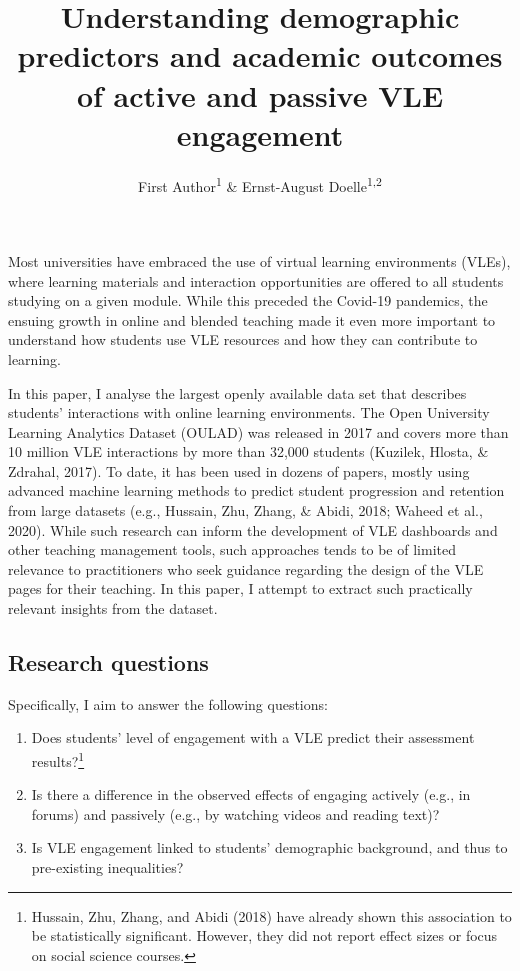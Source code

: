\documentclass[
  english,
  man,mask,floatsintext]{apa6}
\title{Understanding demographic predictors and academic outcomes of active and passive VLE engagement}
\author{First Author\textsuperscript{1} \& Ernst-August Doelle\textsuperscript{1,2}}
\date{}
\affiliation{\vspace{0.5cm}\textsuperscript{1} Wilhelm-Wundt-University\\\textsuperscript{2} Konstanz Business School}
\providecommand{\tightlist}{%
  \setlength{\itemsep}{0pt}\setlength{\parskip}{0pt}}
\begin{document}
\maketitle

Most universities have embraced the use of virtual learning environments (VLEs), where learning materials and interaction opportunities are offered to all students studying on a given module. While this preceded the Covid-19 pandemics, the ensuing growth in online and blended teaching made it even more important to understand how students use VLE resources and how they can contribute to learning.

In this paper, I analyse the largest openly available data set that describes students' interactions with online learning environments. The Open University Learning Analytics Dataset (OULAD) was released in 2017 and covers more than 10 million VLE interactions by more than 32,000 students (Kuzilek, Hlosta, \& Zdrahal, 2017). To date, it has been used in dozens of papers, mostly using advanced machine learning methods to predict student progression and retention from large datasets (e.g., Hussain, Zhu, Zhang, \& Abidi, 2018; Waheed et al., 2020). While such research can inform the development of VLE dashboards and other teaching management tools, such approaches tends to be of limited relevance to practitioners who seek guidance regarding the design of the VLE pages for their teaching. In this paper, I attempt to extract such practically relevant insights from the dataset.

\hypertarget{research-questions}{%
\subsection{Research questions}\label{research-questions}}

Specifically, I aim to answer the following questions:

\begin{enumerate}
\def\labelenumi{\arabic{enumi}.}
\tightlist
\item
  Does students' level of engagement with a VLE predict their assessment results?\footnote{Hussain, Zhu, Zhang, and Abidi (2018) have already shown this association to be statistically significant. However, they did not report effect sizes or focus on social science courses.}
\item
  Is there a difference in the observed effects of engaging actively (e.g., in forums) and passively (e.g., by watching videos and reading text)?
\item
  Is VLE engagement linked to students' demographic background, and thus to pre-existing inequalities?
\end{enumerate}
\end{document}
